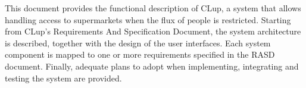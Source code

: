 \documentclass[../../main.tex]{subfiles}
\begin{document}
This document provides the functional description of CLup, a system that allows
handling access to supermarkets when the flux of people is restricted. Starting
from CLup's Requirements And Specification Document, the system architecture is
described, together with the design of the user interfaces. Each system
component is mapped to one or more requirements specified in the RASD document.
Finally, adequate plans to adopt when implementing, integrating and testing the
system are provided. 
\end{document}
